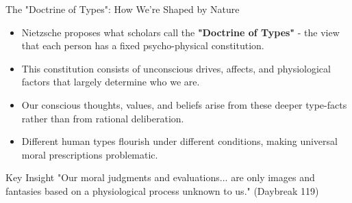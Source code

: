\documentclass{beamer}
\begin{document}
        \begin{frame}{The "Doctrine of Types": How We're Shaped by Nature}
        \begin{itemize}
        \item Nietzsche proposes what scholars call the \textbf{"Doctrine of Types"} - the view that each person has a fixed psycho-physical constitution.
        \item This constitution consists of unconscious drives, affects, and physiological factors that largely determine who we are.
        \item Our conscious thoughts, values, and beliefs arise from these deeper type-facts rather than from rational deliberation.
        \item Different human types flourish under different conditions, making universal moral prescriptions problematic.
        \end{itemize}
        
        \begin{alertblock}{Key Insight}
        "Our moral judgments and evaluations... are only images and fantasies based on a physiological process unknown to us." (Daybreak 119)
        \end{alertblock}
        \end{frame}
\end{document}
